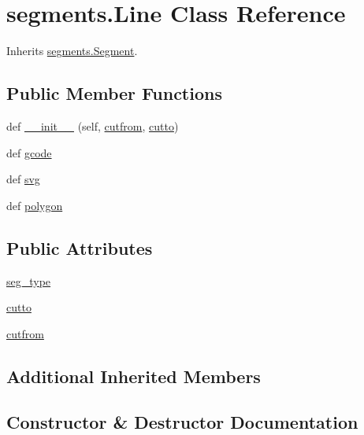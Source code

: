 \hypertarget{classsegments_1_1_line}{}\section{segments.\+Line Class Reference}
\label{classsegments_1_1_line}


Inherits \hyperlink{classsegments_1_1_segment}{segments.\+Segment}.

\subsection*{Public Member Functions}
\begin{DoxyCompactItemize}
\item 
def \hyperlink{classsegments_1_1_line_a62e5d7c179e16a06e08b5d80fc3355eb}{\+\_\+\+\_\+init\+\_\+\+\_\+} (self, \hyperlink{classsegments_1_1_line_ab2b16d59351a9749a5061a01e19f96dc}{cutfrom}, \hyperlink{classsegments_1_1_line_aad74ac6b6db34eb6c1405584d92fe66e}{cutto})
\item 
def \hyperlink{classsegments_1_1_line_ab11c4c3e05f163d8b8b4866113ca36b0}{gcode}
\item 
def \hyperlink{classsegments_1_1_line_a9e4708f2a4b61ff8433d70d638f134a6}{svg}
\item 
def \hyperlink{classsegments_1_1_line_ad7bc5ee97b9b70253b6c403f8d0dfff9}{polygon}
\end{DoxyCompactItemize}
\subsection*{Public Attributes}
\begin{DoxyCompactItemize}
\item 
\hyperlink{classsegments_1_1_line_a74853391d86b0d95c01c67ca216208dc}{seg\+\_\+type}
\item 
\hyperlink{classsegments_1_1_line_aad74ac6b6db34eb6c1405584d92fe66e}{cutto}
\item 
\hyperlink{classsegments_1_1_line_ab2b16d59351a9749a5061a01e19f96dc}{cutfrom}
\end{DoxyCompactItemize}
\subsection*{Additional Inherited Members}


\subsection{Constructor \& Destructor Documentation}
\hypertarget{classsegments_1_1_line_a62e5d7c179e16a06e08b5d80fc3355eb}{}
